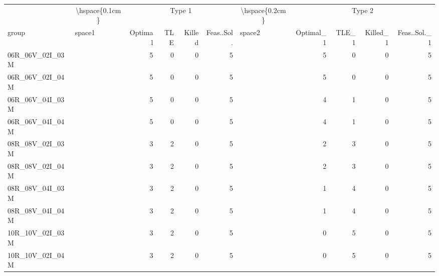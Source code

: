 
\begin{tabular}{llrrrrlrrrr}
\toprule
\multicolumn{1}{c}{} & \multicolumn{1}{c}{\textbackslash{}hspace\{0.1cm\}} & \multicolumn{4}{c}{Type 1} & \multicolumn{1}{c}{\textbackslash{}hspace\{0.2cm\}} & \multicolumn{4}{c}{Type 2} \\
\cmidrule(l{3pt}r{3pt}){2-2} \cmidrule(l{3pt}r{3pt}){3-6} \cmidrule(l{3pt}r{3pt}){7-7} \cmidrule(l{3pt}r{3pt}){8-11}
group & space1 & Optimal & TLE & Killed & Feas..Sol. & space2 & Optimal\_1 & TLE\_1 & Killed\_1 & Feas..Sol.\_1\\
\midrule
06R\_06V\_02I\_03M & \hspace{0.1cm} & 5 & 0 & 0 & 5 & \hspace{0.2cm} & 5 & 0 & 0 & 5\\
06R\_06V\_02I\_04M & \hspace{0.1cm} & 5 & 0 & 0 & 5 & \hspace{0.2cm} & 5 & 0 & 0 & 5\\
06R\_06V\_04I\_03M & \hspace{0.1cm} & 5 & 0 & 0 & 5 & \hspace{0.2cm} & 4 & 1 & 0 & 5\\
06R\_06V\_04I\_04M & \hspace{0.1cm} & 5 & 0 & 0 & 5 & \hspace{0.2cm} & 4 & 1 & 0 & 5\\
\addlinespace
08R\_08V\_02I\_03M & \hspace{0.1cm} & 3 & 2 & 0 & 5 & \hspace{0.2cm} & 2 & 3 & 0 & 5\\
08R\_08V\_02I\_04M & \hspace{0.1cm} & 3 & 2 & 0 & 5 & \hspace{0.2cm} & 2 & 3 & 0 & 5\\
08R\_08V\_04I\_03M & \hspace{0.1cm} & 3 & 2 & 0 & 5 & \hspace{0.2cm} & 1 & 4 & 0 & 5\\
08R\_08V\_04I\_04M & \hspace{0.1cm} & 3 & 2 & 0 & 5 & \hspace{0.2cm} & 1 & 4 & 0 & 5\\
\addlinespace
10R\_10V\_02I\_03M & \hspace{0.1cm} & 3 & 2 & 0 & 5 & \hspace{0.2cm} & 0 & 5 & 0 & 5\\
10R\_10V\_02I\_04M & \hspace{0.1cm} & 3 & 2 & 0 & 5 & \hspace{0.2cm} & 0 & 5 & 0 & 5\\

\end{tabular}
